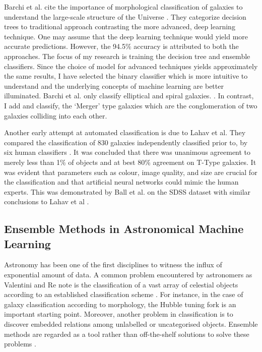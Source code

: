 Barchi et al. cite the importance of morphological classification of galaxies to understand the large-scale structure of the Universe \parencite{barchi_machine_2020}. They categorize decision trees to traditional approach contrasting the more advanced, deep learning technique. One may assume that the deep learning technique would yield more accurate predictions. However, the 94.5\% accuracy is attributed to both the approaches. The focus of my research is training the decision tree and ensemble classifiers. Since the choice of model for advanced techniques yields approximately the same results, I have selected the binary classifier which is more intuitive to understand and the underlying concepts of machine learning are better illuminated.  Barchi et al. only classify elliptical and spiral galaxies.
\parencite{barchi_machine_2020}. In contrast, I add and classify, the `Merger' type galaxies which are the conglomeration of two galaxies colliding into each other.

Another early attempt at automated classification is due to Lahav et al. They compared the classification of 830 galaxies independently classified prior to, by six human classifiers \parencite{lahav_galaxies_1995}. It was concluded that there was unanimous agreement to merely less than 1\% of objects and at best 80\% agreement on T-Type galaxies. It was evident that parameters such as colour, image quality, and size are crucial for the classification and that artificial neural networks could mimic the human experts. This was demonstrated by Ball et al. on the SDSS dataset \parencite*{ball_galaxy_2004} with similar conclusions to Lahav et al \parencite*{lahav_galaxies_1995}. 

\subsection{Ensemble Methods in Astronomical Machine Learning}\label{sec:ema}
Astronomy has been one of the first disciplines to witness the influx of exponential amount of data. A common problem encountered by astronomers as Valentini and Re note is the classification of a vast array of celestial objects according to an established classification scheme \parencite*[579]{way_advances_2012}. For instance, in the case of galaxy classification according to morphology, the Hubble tuning fork is an important starting point. Moreover, another problem in classification is to discover embedded relations among unlabelled or uncategorised objects. Ensemble methods are regarded as a tool rather than off-the-shelf solutions to solve these problems \parencite[579]{way_advances_2012}.


